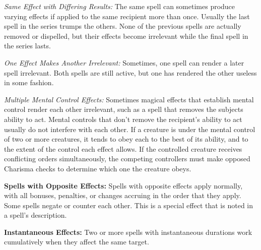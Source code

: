 \textit{Same Effect with Differing Results:} The same spell can sometimes produce 
varying effects if applied to the same recipient more than once. Usually the last 
spell in the series trumps the others. None of the previous spells are actually 
removed or dispelled, but their effects become irrelevant while the final spell 
in the series lasts.

\textit{One Effect Makes Another Irrelevant:} Sometimes, one spell can render a 
later spell irrelevant. Both spells are still active, but one has rendered the 
other useless in some fashion.

\textit{Multiple Mental Control Effects:} Sometimes magical effects that establish 
mental control render each other irrelevant, such as a spell that removes the subjects 
ability to act. Mental controls that don't remove the recipient's ability to act 
usually do not interfere with each other. If a creature is under the mental control 
of two or more creatures, it tends to obey each to the best of its ability, and 
to the extent of the control each effect allows. If the controlled creature receives 
conflicting orders simultaneously, the competing controllers must make opposed 
Charisma checks to determine which one the creature obeys.

\textbf{Spells with Opposite Effects:} Spells with opposite effects apply normally, 
with all bonuses, penalties, or changes accruing in the order that they apply. 
Some spells negate or counter each other. This is a special effect that is noted 
in a spell's description. 

\textbf{Instantaneous Effects:} Two or more spells with instantaneous durations 
work cumulatively when they affect the same target.
